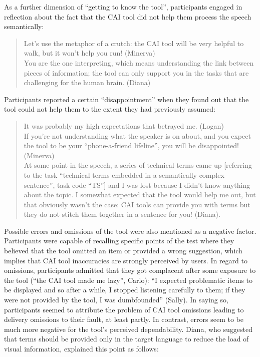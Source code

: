 As a further dimension of ``getting to know the tool'', participants engaged in reflection about the fact that the CAI tool did not help them process the speech semantically:

\begin{quote}
    Let’s use the metaphor of a crutch: the CAI tool will be very helpful to walk, but it won't help you run! (Minerva)\\
You are the one interpreting, which means understanding the link between pieces of information; the tool can only support you in the tasks that are challenging for the human brain. (Diana)
\end{quote}
Participants reported a certain ``disappointment'' when they found out that the tool could not help them to the extent they had previously assumed:

\begin{quote}
    It was probably my high expectations that betrayed me. (Logan) \\
If you're not understanding what the speaker is on about, and you expect the tool to be your ``phone-a-friend lifeline'', you will be disappointed! (Minerva)\\
At some point in the speech, a series of technical terms came up [referring to the task ``technical terms embedded in a semantically complex sentence'', task code “TS”] and I was lost because I didn’t know anything about the topic. I somewhat expected that the tool would help me out, but that obviously wasn’t the case: CAI tools can provide you with terms but they do not stitch them together in a sentence for you! (Diana).
\end{quote}

Possible errors and omissions of the tool were also mentioned as a negative factor. Participants were capable of recalling specific points of the test where they believed that the tool omitted an item or provided a wrong suggestion, which implies that CAI tool inaccuracies are strongly perceived by users. In regard to omissions, participants admitted that they got complacent after some exposure to the tool (``the CAI tool made me lazy'', Carlo): ``I expected problematic items to be displayed and so after a while, I stopped listening carefully to them; if they were not provided by the tool, I was dumbfounded'' (Sally). In saying so, participants seemed to attribute the problem of CAI tool omissions leading to delivery omissions to their fault, at least partly. In contrast, errors seem to be much more negative for the tool’s perceived dependability. Diana, who suggested that terms should be provided only in the target language to reduce the load of visual information, explained this point as follows:

